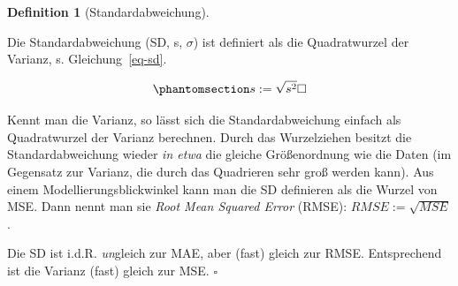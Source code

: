 \documentclass[
  letterpaper,
  twoside,
  open=any]{scrbook}
\theoremstyle{definition}
\theoremstyle{definition}
\theoremstyle{definition}
\newtheorem{definition}{Definition}[chapter]
\theoremstyle{remark}
\begin{document}
\begin{definition}[Standardabweichung]\protect\hypertarget{def-sd}{}\label{def-sd}

Die Standardabweichung (SD, s, \(\sigma\)) ist definiert als die
Quadratwurzel der Varianz, s. Gleichung~\ref{eq-sd}.

\begin{equation}\phantomsection\label{eq-sd}{s := \sqrt{s^2} \square}\end{equation}

\end{definition}

Kennt man die Varianz, so lässt sich die Standardabweichung einfach als
Quadratwurzel der Varianz berechnen. Durch das Wurzelziehen besitzt die
Standardabweichung wieder \emph{in etwa} die gleiche Größenordnung wie
die Daten (im Gegensatz zur Varianz, die durch das Quadrieren sehr groß
werden kann). Aus einem Modellierungsblickwinkel kann man die SD
definieren als die Wurzel von MSE. Dann nennt man sie \emph{Root Mean
Squared Error} (RMSE): \(RMSE := \sqrt{MSE}\).

\begin{tcolorbox}[enhanced jigsaw, colframe=quarto-callout-note-color-frame, arc=.35mm, leftrule=.75mm, bottomtitle=1mm, titlerule=0mm, colbacktitle=quarto-callout-note-color!10!white, breakable, bottomrule=.15mm, colback=white, left=2mm, rightrule=.15mm, opacityback=0, toptitle=1mm, toprule=.15mm, opacitybacktitle=0.6, title=\textcolor{quarto-callout-note-color}{\faInfo}\hspace{0.5em}{Hinweis}, coltitle=black]

Die SD ist i.d.R. \emph{un}gleich zur MAE, aber (fast) gleich zur RMSE.
Entsprechend ist die Varianz (fast) gleich zur MSE. \(\square\)

\end{tcolorbox}
\end{document}
